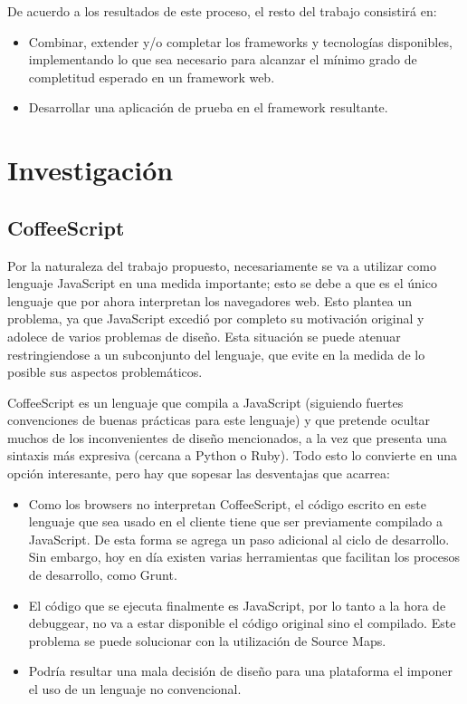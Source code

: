 \documentclass[doc,helv,longtable]{article}
\begin{document}
De acuerdo a los resultados de este proceso, el resto del trabajo consistirá en:
\begin{itemize}
\item  Combinar, extender y/o completar los frameworks y tecnologías disponibles, implementando lo que sea necesario para alcanzar el mínimo grado de completitud esperado en un framework web.  
\item  Desarrollar una aplicación de prueba en el framework resultante.

\end{itemize}
\section{Investigación}
\subsection{CoffeeScript}


Por la naturaleza del trabajo propuesto, necesariamente se va a utilizar como lenguaje JavaScript en una medida importante; esto se debe a que es el único lenguaje que por ahora interpretan los navegadores web. Esto plantea un problema, ya que JavaScript excedió por completo su motivación original y adolece de varios problemas de diseño\cite{goodparts}. Esta situación se puede atenuar restringiendose a un subconjunto del lenguaje, que evite en la medida de lo posible sus aspectos problemáticos.

CoffeeScript es un lenguaje que compila a JavaScript (siguiendo fuertes convenciones de buenas prácticas para este lenguaje) y que pretende ocultar muchos de los inconvenientes de diseño mencionados, a la vez que presenta una sintaxis más expresiva (cercana a Python o Ruby). Todo esto lo convierte en una opción interesante, pero hay que sopesar las desventajas que acarrea: 
\begin{itemize}
\item  Como los browsers no interpretan CoffeeScript, el código escrito en este lenguaje que sea usado en el cliente tiene que ser previamente compilado a JavaScript. De esta forma  se agrega un paso adicional al ciclo de desarrollo. Sin embargo, hoy en día existen varias herramientas que facilitan los procesos de desarrollo, como Grunt\cite{grunt}.
\item  El código que se ejecuta finalmente es JavaScript, por lo tanto a la hora de debuggear, no va a estar disponible el código original sino el compilado. Este problema se puede solucionar con la utilización de Source Maps\cite{sourcemaps}.
\item  Podría resultar una mala decisión de diseño para una plataforma el imponer el uso de un lenguaje no convencional. 

\end{itemize}
\end{document}
